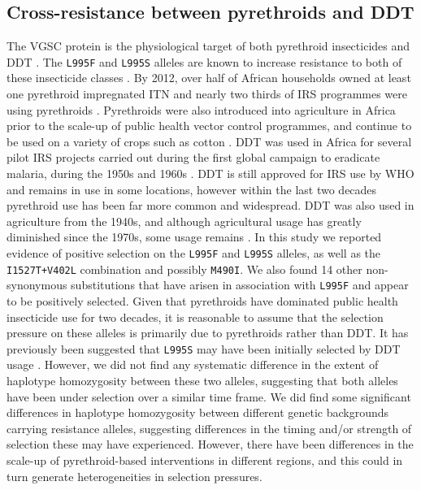 \documentclass[a4paper,11pt,abstracton,hidelinks]{scrartcl}
\begin{document}
\subsection*{Cross-resistance between pyrethroids and DDT}


%
The VGSC protein is the physiological target of both pyrethroid insecticides and DDT \cite{Davies2007a}.
%
The \texttt{L995F} and \texttt{L995S} alleles are known to increase resistance to both of these insecticide classes \cite{Martinez-Torres1998,Ranson2000}.
%
By 2012, over half of African households owned at least one pyrethroid impregnated ITN and nearly two thirds of IRS programmes were using pyrethroids \cite{Hemingway2016}.
%
Pyrethroids were also introduced into agriculture in Africa prior to the scale-up of public health vector control programmes, and continue to be used on a variety of crops such as cotton \cite{Reid2016}.
%
DDT was used in Africa for several pilot IRS projects carried out during the first global campaign to eradicate malaria, during the 1950s and 1960s \cite{Davies2007b}.
%
DDT is still approved for IRS use by WHO and remains in use in some locations, however within the last two decades pyrethroid use has been far more common and widespread.
%
DDT was also used in agriculture from the 1940s, and although agricultural usage has greatly diminished since the 1970s, some usage remains \cite{Abuelmaali2013}.
%
In this study we reported evidence of positive selection on the \texttt{L995F} and \texttt{L995S} alleles, as well as the \texttt{I1527T+V402L} combination and possibly \texttt{M490I}.
%
We also found 14 other non-synonymous substitutions that have arisen in association with \texttt{L995F} and appear to be positively selected.
%
Given that pyrethroids have dominated public health insecticide use for two decades, it is reasonable to assume that the selection pressure on these alleles is primarily due to pyrethroids rather than DDT.
%
It has previously been suggested that \texttt{L995S} may have been initially selected by DDT usage \cite{Lynd2010}.
%
However, we did not find any systematic difference in the extent of haplotype homozygosity between these two alleles, suggesting that both alleles have been under selection over a similar time frame.
%
We did find some significant differences in haplotype homozygosity between different genetic backgrounds carrying resistance alleles, suggesting differences in the timing and/or strength of selection these may have experienced.
%
However, there have been differences in the scale-up of pyrethroid-based interventions in different regions, and this could in turn generate heterogeneities in selection pressures.
\end{document}
